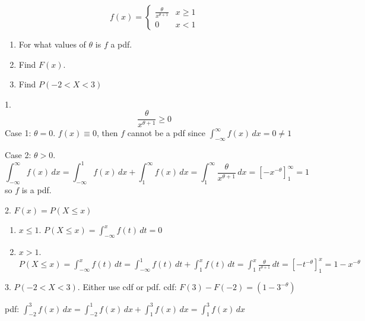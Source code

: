 \begin{Example}{}{}
    \[ f(x)=\begin{cases}
            \frac{\theta}{x^{\theta+1}} & x\geqslant 1 \\
            0                           & x<1
        \end{cases} \]
    \begin{enumerate}
        \item For what values of $ \theta $ is $ f $ a pdf.
        \item Find $ F(x) $.
        \item Find $ P(-2<X<3) $
    \end{enumerate}
    1. \[ \frac{\theta}{x^{\theta+1}} \geqslant 0 \]
    Case 1: $ \theta=0 $. $ f(x)\equiv 0 $, then $ f $
    cannot be a pdf since $ \int_{-\infty}^{\infty} f(x)\, d{x}=0\neq 1 $

    Case 2: $ \theta>0 $.
    \[ \int_{-\infty}^{\infty} f(x)\, d{x}=\int_{-\infty}^{1} f(x)\, d{x}
        +\int_{1}^{\infty} f(x)\, d{x}=\int_{1}^{\infty} \frac{\theta}{x^{\theta+1}}\, d{x}
        =\left[ -x^{-\theta} \right]_1^\infty=1 \]
    so $ f $ is a pdf.

    2. $ F(x)=P(X\leqslant x) $
    \begin{enumerate}
        \item $ x\leqslant 1 $. $ P(X\leqslant x)=\int_{-\infty}^{x} f(t)\, d{t} =0 $
        \item $ x>1 $. $ P(X\leqslant x)=\int_{-\infty}^{x} f(t)\, d{t}
                  =\int_{-\infty}^{1} f(t)\, d{t} +\int_{1}^{x} f(t)\, d{t}
                  =\int_{1}^{x} \frac{\theta}{t^{\theta+1}} \, d{t}=\left[ -t^{-\theta} \right]_1^x=
                  1-x^{-\theta}  $
    \end{enumerate}
    3. $ P(-2<X<3) $. Either use cdf or pdf.
    cdf: $ F(3)-F(-2)=(1-3^{-\theta}) $

    pdf: $ \int_{-2}^{3} f(x)\, d{x}=
        \int_{-2}^{1} f(x)\, d{x} +\int_{1}^{3} f(x)\, d{x}
        =\int_{1}^{3} f(x)\, d{x} $

\end{Example}
